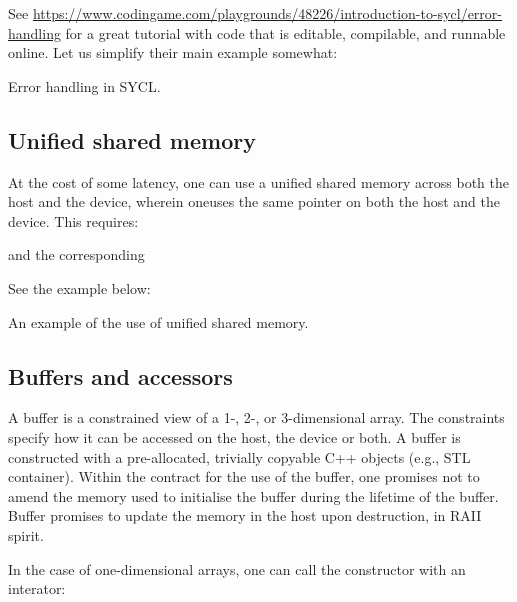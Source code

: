 See \url{https://www.codingame.com/playgrounds/48226/introduction-to-sycl/error-handling} for a great tutorial with code that is editable, compilable, and runnable online. Let us simplify their main example somewhat:

\raggedbottom
\begin{codebox}[]{\href{https://godbolt.org/z/}{\ExternalLink}}
\footnotesize Error handling in SYCL.
\tcblower
{}
\end{codebox}
  
\subsection{Unified shared memory}
 
At the cost of some latency, one can use a unified shared memory across both the host and the device, wherein oneuses the same pointer on both the host and the device. This requires:
 

and the corresponding 


See the example below:
\raggedbottom
\begin{codebox}[]{\href{https://godbolt.org/z/}{\ExternalLink}}
\footnotesize An example of the use of unified shared memory.
\tcblower
{}
\end{codebox}
 
\subsection{Buffers and accessors}

A buffer is a constrained view of a 1-, 2-, or 3-dimensional array.
The constraints specify how it can be accessed on the host, the device or both. 
A buffer is constructed with a pre-allocated, trivially copyable C++ objects (e.g., STL container). 
Within the contract for the use of the buffer, 
one promises not to amend the memory used to initialise the buffer during the lifetime of the buffer. 
Buffer promises to update the memory in the host upon destruction, in RAII spirit. 

In the case of one-dimensional arrays, one can call the constructor with an interator:


